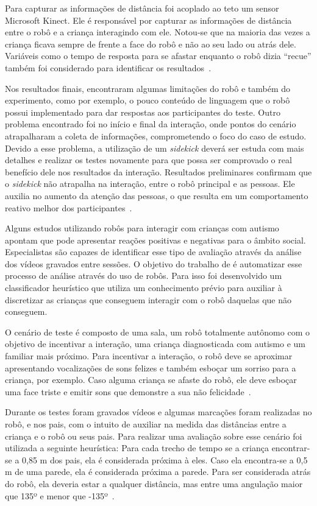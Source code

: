 Para capturar as informações de distância foi acoplado ao teto um sensor Microsoft Kinect. Ele é responsável por capturar as informações de distância entre o robô e a criança interagindo com ele. Notou-se que na maioria das vezes a criança ficava sempre de frente a face do robô e não ao seu lado ou atrás dele. Variáveis como o tempo de resposta para se afastar enquanto o robô dizia ``recue'' também foi considerado para identificar os resultados~\cite{vazquez:2014}.

Nos resultados finais, \textcite{vazquez:2014} encontraram algumas limitações do robô e também do experimento, como por exemplo, o pouco conteúdo de linguagem que o robô possui implementado para dar respostas aos participantes do teste. Outro problema encontrado foi no início e final da interação, onde pontos do cenário atrapalharam a coleta de informações, comprometendo o foco do caso de estudo. Devido a esse problema, a utilização de um \emph{sidekick} deverá ser estuda com mais detalhes e realizar os testes novamente para que possa ser comprovado o real benefício dele nos resultados da interação. Resultados preliminares confirmam que o \emph{sidekick} não atrapalha na interação, entre o robô principal e as pessoas. Ele auxilia no aumento da atenção das pessoas, o que resulta em um comportamento reativo melhor dos participantes~\cite{vazquez:2014}.

Alguns estudos utilizando robôs para interagir com crianças com autismo apontam que pode apresentar reações positivas e negativas para o âmbito social. Especialistas são capazes de identificar esse tipo de avaliação através da análise dos vídeos gravados entre sessões. O objetivo do trabalho de \textcite{feil-seifer:2010} é automatizar esse processo de análise através do uso de robôs. Para isso foi desenvolvido um classificador heurístico que utiliza um conhecimento prévio para auxiliar à discretizar as crianças que conseguem interagir com o robô daquelas que não conseguem.

O cenário de teste é composto de uma sala, um robô totalmente autônomo com o objetivo de incentivar a interação, uma criança diagnosticada com autismo e um familiar mais próximo. Para incentivar a interação, o robô deve se aproximar apresentando vocalizações de sons felizes e também esboçar um sorriso para a criança, por exemplo. Caso alguma criança se afaste do robô, ele deve esboçar uma face triste e emitir sons que demonstre a sua não felicidade~\cite{feil-seifer:2010}.

Durante os testes foram gravados vídeos e algumas marcações foram realizadas no robô, e nos pais, com o intuito de auxiliar na medida das distâncias entre a criança e o robô ou seus pais. Para realizar uma avaliação sobre esse cenário foi utilizada a seguinte heurística: Para cada trecho de tempo se a criança encontrar-se a 0,85 m dos pais, ela é considerada próxima à eles. Caso ela encontra-se a 0,5 m de uma parede, ela é considerada próxima a parede. Para ser considerada atrás do robô, ela deveria estar a qualquer distância, mas entre uma angulação maior que 135º e menor que -135º~\cite{feil-seifer:2010}.


